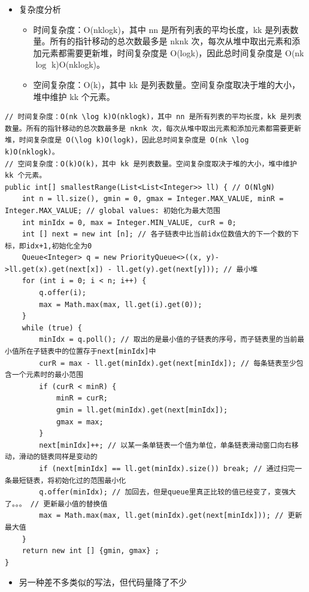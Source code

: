 \documentclass[9pt, b5paaper]{book}
\begin{document}
\begin{enumerate}
\begin{itemize}
\item 复杂度分析
\begin{itemize}
\item 时间复杂度：O(nklogk)，其中 nn 是所有列表的平均长度，kk 是列表数量。所有的指针移动的总次数最多是 nknk 次，每次从堆中取出元素和添加元素都需要更新堆，时间复杂度是 O(logk)，因此总时间复杂度是 O(nk $\log$ k)O(nklogk)。
\item 空间复杂度：O(k)，其中 kk 是列表数量。空间复杂度取决于堆的大小，堆中维护 kk 个元素。
\end{itemize}
\end{itemize}
\begin{verbatim}
// 时间复杂度：O(nk \log k)O(nklogk)，其中 nn 是所有列表的平均长度，kk 是列表数量。所有的指针移动的总次数最多是 nknk 次，每次从堆中取出元素和添加元素都需要更新堆，时间复杂度是 O(\log k)O(logk)，因此总时间复杂度是 O(nk \log k)O(nklogk)。
// 空间复杂度：O(k)O(k)，其中 kk 是列表数量。空间复杂度取决于堆的大小，堆中维护 kk 个元素。
public int[] smallestRange(List<List<Integer>> ll) { // O(NlgN)
    int n = ll.size(), gmin = 0, gmax = Integer.MAX_VALUE, minR = Integer.MAX_VALUE; // global values: 初始化为最大范围
    int minIdx = 0, max = Integer.MIN_VALUE, curR = 0;
    int [] next = new int [n]; // 各子链表中比当前idx位数值大的下一个数的下标，即idx+1,初始化全为0
    Queue<Integer> q = new PriorityQueue<>((x, y)->ll.get(x).get(next[x]) - ll.get(y).get(next[y])); // 最小堆
    for (int i = 0; i < n; i++) {
        q.offer(i);
        max = Math.max(max, ll.get(i).get(0));
    }
    while (true) {
        minIdx = q.poll(); // 取出的是最小值的子链表的序号，而子链表里的当前最小值所在子链表中的位置存于next[minIdx]中
        curR = max - ll.get(minIdx).get(next[minIdx]); // 每条链表至少包含一个元素时的最小范围
        if (curR < minR) {
            minR = curR;
            gmin = ll.get(minIdx).get(next[minIdx]);
            gmax = max;
        }
        next[minIdx]++; // 以某一条单链表一个值为单位，单条链表滑动窗口向右移动，滑动的链表同样是变动的
        if (next[minIdx] == ll.get(minIdx).size()) break; // 通过扫完一条最短链表，将初始化过的范围最小化
        q.offer(minIdx); // 加回去，但是queue里真正比较的值已经变了，变强大了。。。 // 更新最小值的替换值 
        max = Math.max(max, ll.get(minIdx).get(next[minIdx])); // 更新最大值
    }
    return new int [] {gmin, gmax} ;
}
\end{verbatim}
\begin{itemize}
\item 另一种差不多类似的写法，但代码量降了不少

\end{itemize}
\end{enumerate}
\end{document}
